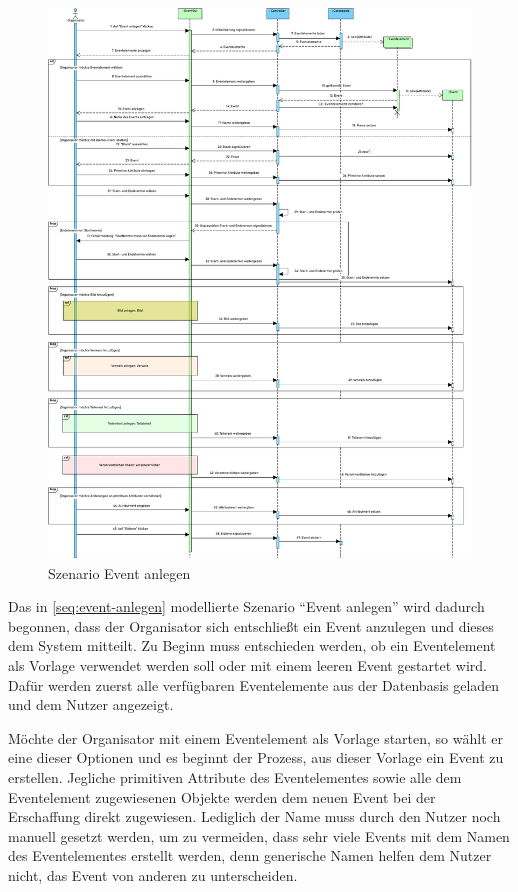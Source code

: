 \begin{figure}[ht!]
    \centering
    \includegraphics[width=0.98\columnwidth]{Bilder/seq_Event_anlegen.pdf}
    \caption{Szenario Event anlegen}
    \label{seq:event-anlegen}
\end{figure}

Das in \autoref{seq:event-anlegen} modellierte Szenario \enquote{Event anlegen} wird dadurch begonnen, dass der Organisator sich entschließt ein Event anzulegen und dieses dem System mitteilt. Zu Beginn muss entschieden werden, ob ein Eventelement als Vorlage verwendet werden soll oder mit einem leeren Event gestartet wird. Dafür werden zuerst alle verfügbaren Eventelemente aus der Datenbasis geladen und dem Nutzer angezeigt.

Möchte der Organisator mit einem Eventelement als Vorlage starten, so wählt er eine dieser Optionen und es beginnt der Prozess, aus dieser Vorlage ein Event zu erstellen. Jegliche primitiven Attribute des Eventelementes sowie alle dem Eventelement zugewiesenen Objekte werden dem neuen Event bei der Erschaffung direkt zugewiesen. Lediglich der Name muss durch den Nutzer noch manuell gesetzt werden, um zu vermeiden, dass sehr viele Events mit dem Namen des Eventelementes erstellt werden, denn generische Namen helfen dem Nutzer nicht, das Event von anderen zu unterscheiden.

